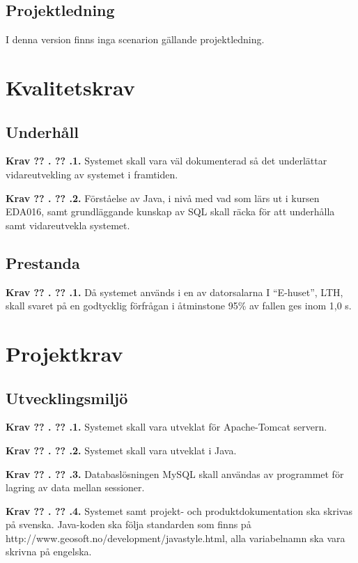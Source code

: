 \documentclass[a4paper]{article}
\newcommand\getcurrentref[1]{%
 \ifnumequal{\value{#1}}{0}
  {??}
  {\the\value{#1}}%
}
\newcommand\requirement[2]{
	\numberedrow{Krav}{#1}{#2}
}
\newcommand\numberedrow[3]{
	\noindent
	\textbf{#1 \getcurrentref{section}.\getcurrentref{subsection}.#2.} #3
	
}
\begin{document}
\subsection{Projektledning}
I denna version finns inga scenarion gällande projektledning.
\section{Kvalitetskrav}
\subsection{Underhåll}
\requirement{1}{Systemet skall vara väl dokumenterad så det underlättar vidareutvekling av systemet i framtiden.}
\requirement{2}{Förståelse av Java, i nivå med vad som lärs ut i kursen EDA016, samt grundläggande kunskap av SQL skall räcka för att underhålla samt vidareutvekla systemet.}
\subsection{Prestanda}
\requirement{1}{Då systemet används i en av datorsalarna I “E-huset”, LTH, skall svaret på en godtycklig förfrågan i åtminstone 95\% av fallen ges inom 1,0 s.}
\section{Projektkrav}
\subsection{Utvecklingsmiljö}
\requirement{1}{Systemet skall vara utveklat för Apache-Tomcat servern.}
\requirement{2}{Systemet skall vara utveklat i Java.}
\requirement{3}{Databaslösningen MySQL skall användas av programmet för lagring av data mellan sessioner.}
\requirement{4}{Systemet samt projekt- och produktdokumentation ska skrivas på svenska. Java-koden ska följa standarden som finns på http://www.geosoft.no/development/javastyle.html, alla variabelnamn ska vara skrivna på engelska.}
\end{document}
